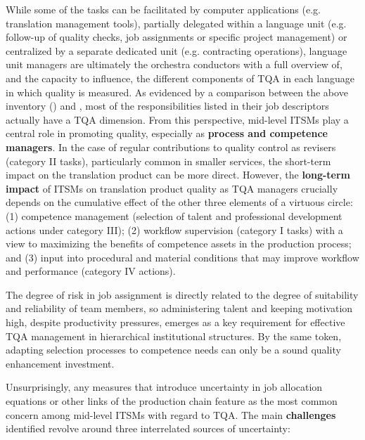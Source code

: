 \documentclass[output=paper]{langsci/langscibook}
\begin{document}
While some of the tasks can be facilitated by computer applications (e.g. translation management tools), partially delegated within a language unit (e.g. follow-up of quality checks, job assignments or specific project management) or centralized by a separate dedicated unit (e.g. contracting operations), language unit managers are ultimately the orchestra conductors with a full overview of, and the capacity to influence, the different components of TQA in each language in which quality is measured. As evidenced by a comparison between the above inventory () and , most of the responsibilities listed in their job descriptors actually have a TQA dimension. From this perspective, mid-level ITSMs play a central role in promoting quality, especially as \textbf{process and competence managers}. In the case of regular contributions to quality control as revisers (category II tasks), particularly common in smaller services, the short-term impact on the translation product can be more direct. However, the \textbf{long-term impact} of ITSMs on translation product quality as TQA managers  crucially depends on the cumulative effect of the other three elements of a virtuous circle: (1) competence management (selection of talent and professional development actions under category III); (2) workflow supervision (category I tasks) with a view to maximizing the benefits of competence assets in the production process; and (3) input into procedural and material conditions that may improve workflow and performance (category IV actions).



The degree of risk in job assignment is directly related to the degree of suitability and reliability of team members, so administering talent and keeping motivation high, despite productivity pressures, emerges as a key requirement for effective TQA management in hierarchical institutional structures. By the same token, adapting selection processes to competence needs can only be a sound quality enhancement investment. 



Unsurprisingly, any measures that introduce uncertainty in job allocation equations or other links of the production chain feature as the most common concern among mid-level ITSMs with regard to TQA. The main \textbf{challenges} identified revolve around three interrelated sources of uncertainty:
\end{document}
